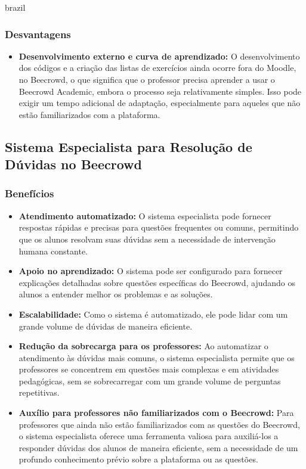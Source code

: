 \begin{otherlanguage*}{brazil}
\subsubsection{Desvantagens}
\begin{itemize}
    \item \textbf{Desenvolvimento externo e curva de aprendizado:} O desenvolvimento dos códigos e a criação das listas de exercícios ainda ocorre fora do Moodle, no Beecrowd, o que significa que o professor precisa aprender a usar o Beecrowd Academic, embora o processo seja relativamente simples. Isso pode exigir um tempo adicional de adaptação, especialmente para aqueles que não estão familiarizados com a plataforma.
\end{itemize}

\subsection{Sistema Especialista para Resolução de Dúvidas no Beecrowd}

\subsubsection{Benefícios}
\begin{itemize}
    \item \textbf{Atendimento automatizado:} O sistema especialista pode fornecer respostas rápidas e precisas para questões frequentes ou comuns, permitindo que os alunos resolvam suas dúvidas sem a necessidade de intervenção humana constante.
    \item \textbf{Apoio no aprendizado:} O sistema pode ser configurado para fornecer explicações detalhadas sobre questões específicas do Beecrowd, ajudando os alunos a entender melhor os problemas e as soluções.
    \item \textbf{Escalabilidade:} Como o sistema é automatizado, ele pode lidar com um grande volume de dúvidas de maneira eficiente.
    \item \textbf{Redução da sobrecarga para os professores:} Ao automatizar o atendimento às dúvidas mais comuns, o sistema especialista permite que os professores se concentrem em questões mais complexas e em atividades pedagógicas, sem se sobrecarregar com um grande volume de perguntas repetitivas.
    \item \textbf{Auxílio para professores não familiarizados com o Beecrowd:} Para professores que ainda não estão familiarizados com as questões do Beecrowd, o sistema especialista oferece uma ferramenta valiosa para auxiliá-los a responder dúvidas dos alunos de maneira eficiente, sem a necessidade de um profundo conhecimento prévio sobre a plataforma ou as questões.
\end{itemize}


\end{otherlanguage*}
